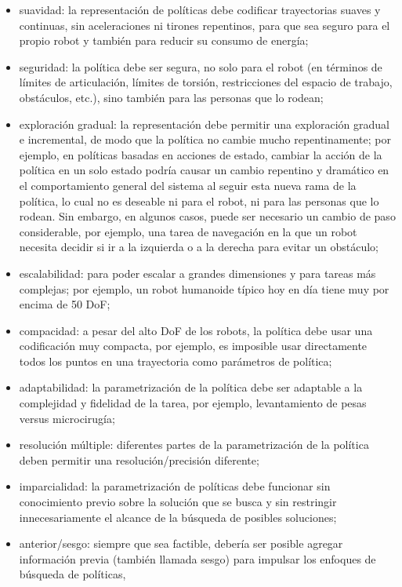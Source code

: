 \documentclass{svproc}
\begin{document}
\begin{itemize}   
    \item suavidad: la representación de políticas debe codificar trayectorias suaves y continuas, sin aceleraciones ni tirones repentinos, para que sea seguro para el propio robot y también para reducir su consumo de energía;
    \item seguridad: la política debe ser segura, no solo para el robot (en términos de límites de articulación, límites de torsión, restricciones del espacio de trabajo, obstáculos, etc.), sino también para las personas que lo rodean;
    \item exploración gradual: la representación debe permitir una exploración gradual e incremental, de modo que la política no cambie mucho repentinamente; por ejemplo, en políticas basadas en acciones de estado, cambiar la acción de la política en un solo estado podría causar un cambio repentino y dramático en el comportamiento general del sistema al seguir esta nueva rama de la política, lo cual no es deseable ni para el robot, ni para las personas que lo rodean. Sin embargo, en algunos casos, puede ser necesario un cambio de paso considerable, por ejemplo, una tarea de navegación en la que un robot necesita decidir si ir a la izquierda o a la derecha para evitar un obstáculo;
    \item escalabilidad: para poder escalar a grandes dimensiones y para tareas más complejas; por ejemplo, un robot humanoide típico hoy en día tiene muy por encima de 50 DoF;
    \item compacidad: a pesar del alto DoF de los robots, la política debe usar una codificación muy compacta, por ejemplo, es imposible usar directamente todos los puntos en una trayectoria como parámetros de política;
    \item adaptabilidad: la parametrización de la política debe ser adaptable a la complejidad y fidelidad de la tarea, por ejemplo, levantamiento de pesas versus microcirugía;
    \item resolución múltiple: diferentes partes de la parametrización de la política deben permitir una resolución/precisión diferente;
    \item imparcialidad: la parametrización de políticas debe funcionar sin conocimiento previo sobre la solución que se busca y sin restringir innecesariamente el alcance de la búsqueda de posibles soluciones;
    \item anterior/sesgo: siempre que sea factible, debería ser posible agregar información previa (también llamada sesgo) para impulsar los enfoques de búsqueda de políticas,

\end{itemize}
\end{document}
